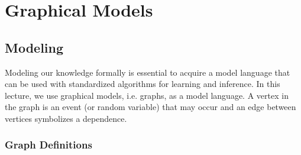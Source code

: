 \chapter{Graphical Models}
%
%
%
\section{Modeling}
Modeling our knowledge formally is essential to acquire a model language that can be used with standardized algorithms for learning and inference. %
In this lecture, we use graphical models, i.e. graphs, as a model language. %
A vertex in the graph is an event (or random variable) that may occur and an edge between vertices symbolizes a dependence. %
%
%
%
\subsection{Graph Definitions}
\begin{minipage}[t]{1\textwidth}
	\begin{minipage}[t]{.48\textwidth}
		\begin{figure}[H]
			\centering{}
		\end{figure}
	\end{minipage}
	\hfill
	\begin{minipage}[t]{.48\textwidth}
		\begin{figure}[H]
			\centering{}
		\end{figure}
	\end{minipage}
\end{minipage}
\vspace*{5pt}
